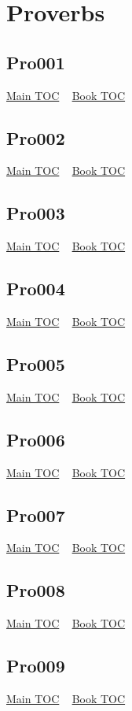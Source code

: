 \documentclass{book}
\begin{document}
  \chapter{Proverbs} \label{subsec:Pro} \begin{multicols}{2} \minitoc \end{multicols}
  \section{Pro001}\hyperlink{toc}{Main TOC} ~ \hyperref[subsec:Pro]{Book TOC} 
  \section{Pro002}\hyperlink{toc}{Main TOC} ~ \hyperref[subsec:Pro]{Book TOC} 
  \section{Pro003}\hyperlink{toc}{Main TOC} ~ \hyperref[subsec:Pro]{Book TOC} 
  \section{Pro004}\hyperlink{toc}{Main TOC} ~ \hyperref[subsec:Pro]{Book TOC} 
  \section{Pro005}\hyperlink{toc}{Main TOC} ~ \hyperref[subsec:Pro]{Book TOC} 
  \section{Pro006}\hyperlink{toc}{Main TOC} ~ \hyperref[subsec:Pro]{Book TOC} 
  \section{Pro007}\hyperlink{toc}{Main TOC} ~ \hyperref[subsec:Pro]{Book TOC} 
  \section{Pro008}\hyperlink{toc}{Main TOC} ~ \hyperref[subsec:Pro]{Book TOC} 
  \section{Pro009}\hyperlink{toc}{Main TOC} ~ \hyperref[subsec:Pro]{Book TOC} 
\end{document}
